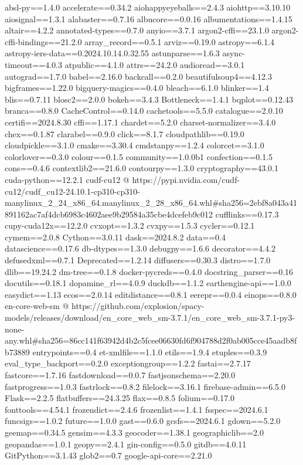 absl-py==1.4.0
accelerate==0.34.2
aiohappyeyeballs==2.4.3
aiohttp==3.10.10
aiosignal==1.3.1
alabaster==0.7.16
albucore==0.0.16
albumentations==1.4.15
altair==4.2.2
annotated-types==0.7.0
anyio==3.7.1
argon2-cffi==23.1.0
argon2-cffi-bindings==21.2.0
array_record==0.5.1
arviz==0.19.0
astropy==6.1.4
astropy-iers-data==0.2024.10.14.0.32.55
astunparse==1.6.3
async-timeout==4.0.3
atpublic==4.1.0
attrs==24.2.0
audioread==3.0.1
autograd==1.7.0
babel==2.16.0
backcall==0.2.0
beautifulsoup4==4.12.3
bigframes==1.22.0
bigquery-magics==0.4.0
bleach==6.1.0
blinker==1.4
blis==0.7.11
blosc2==2.0.0
bokeh==3.4.3
Bottleneck==1.4.1
bqplot==0.12.43
branca==0.8.0
CacheControl==0.14.0
cachetools==5.5.0
catalogue==2.0.10
certifi==2024.8.30
cffi==1.17.1
chardet==5.2.0
charset-normalizer==3.4.0
chex==0.1.87
clarabel==0.9.0
click==8.1.7
cloudpathlib==0.19.0
cloudpickle==3.1.0
cmake==3.30.4
cmdstanpy==1.2.4
colorcet==3.1.0
colorlover==0.3.0
colour==0.1.5
community==1.0.0b1
confection==0.1.5
cons==0.4.6
contextlib2==21.6.0
contourpy==1.3.0
cryptography==43.0.1
cuda-python==12.2.1
cudf-cu12 @ https://pypi.nvidia.com/cudf-cu12/cudf_cu12-24.10.1-cp310-cp310-manylinux_2_24_x86_64.manylinux_2_28_x86_64.whl#sha256=2ebf8a043a41891162ac7af4dcb6983c4602aee9b29584a35cbe4dcefeb9c012
cufflinks==0.17.3
cupy-cuda12x==12.2.0
cvxopt==1.3.2
cvxpy==1.5.3
cycler==0.12.1
cymem==2.0.8
Cython==3.0.11
dask==2024.8.2
data==0.4
datascience==0.17.6
db-dtypes==1.3.0
debugpy==1.6.6
decorator==4.4.2
defusedxml==0.7.1
Deprecated==1.2.14
diffusers==0.30.3
distro==1.7.0
dlib==19.24.2
dm-tree==0.1.8
docker-pycreds==0.4.0
docstring_parser==0.16
docutils==0.18.1
dopamine_rl==4.0.9
duckdb==1.1.2
earthengine-api==1.0.0
easydict==1.13
ecos==2.0.14
editdistance==0.8.1
eerepr==0.0.4
einops==0.8.0
en-core-web-sm @ https://github.com/explosion/spacy-models/releases/download/en_core_web_sm-3.7.1/en_core_web_sm-3.7.1-py3-none-any.whl#sha256=86cc141f63942d4b2c5fcee06630fd6f904788d2f0ab005cce45aadb8fb73889
entrypoints==0.4
et-xmlfile==1.1.0
etils==1.9.4
etuples==0.3.9
eval_type_backport==0.2.0
exceptiongroup==1.2.2
fastai==2.7.17
fastcore==1.7.16
fastdownload==0.0.7
fastjsonschema==2.20.0
fastprogress==1.0.3
fastrlock==0.8.2
filelock==3.16.1
firebase-admin==6.5.0
Flask==2.2.5
flatbuffers==24.3.25
flax==0.8.5
folium==0.17.0
fonttools==4.54.1
frozendict==2.4.6
frozenlist==1.4.1
fsspec==2024.6.1
funcsigs==1.0.2
future==1.0.0
gast==0.6.0
gcsfs==2024.6.1
gdown==5.2.0
geemap==0.34.5
gensim==4.3.3
geocoder==1.38.1
geographiclib==2.0
geopandas==1.0.1
geopy==2.4.1
gin-config==0.5.0
gitdb==4.0.11
GitPython==3.1.43
glob2==0.7
google-api-core==2.21.0
